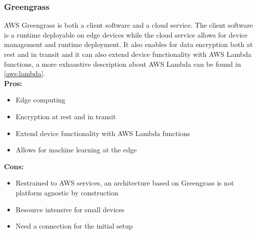         \subsubsection{Greengrass}
        \label{aws:greengrass}
 AWS Greengrass is both a client software and a cloud service. The client software is a runtime deployable on edge devices while the cloud service allows for device management and runtime deployment.
 It also enables for data encryption both at rest and in transit and it can also extend device functionality with AWS Lambda functions, a more exhaustive description about AWS Lambda can be found in \ref{aws:lambda}.\\
        \textbf{Pros:}
        \begin{itemize}
            \item Edge computing
            \item Encryption at rest and in transit
            \item Extend device functionality with AWS Lambda functions
            \item Allows for machine learning at the edge
        \end{itemize}
        \textbf{Cons:}
        \begin{itemize}
            \item Restrained to AWS services, an architecture based on Greengrass is not platform agnostic by construction
            \item Resource intensive for small devices
            \item Need a connection for the initial setup
        \end{itemize}
        
